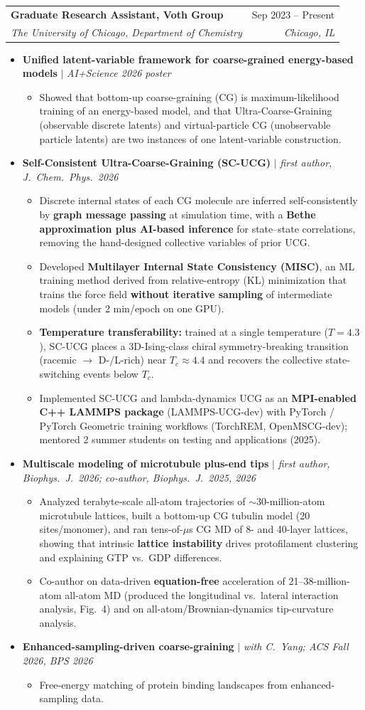 \documentclass[letterpaper,10.5pt]{article}
\makeatletter
\newcommand{\resumeItem}[1]{\item\small{#1\vspace{-1pt}}}
\newcommand{\resumeSubheading}[4]{
  \vspace{-1pt}\item
    \begin{tabular*}{\textwidth}[t]{l@{\extracolsep{\fill}}r}
      \textbf{#1} & \small #2 \\
      \textit{\small #3} & \textit{\small #4} \\
    \end{tabular*}\vspace{-6pt}
}
\newcommand{\resumeItemListStart}{\begin{itemize}[leftmargin=0.18in, itemsep=0.5pt, parsep=0pt]}
\newcommand{\resumeItemListEnd}{\end{itemize}\vspace{-4pt}}
\newcommand{\resumeTopic}[1]{\item\small{#1}\vspace{-1pt}}
\newcommand{\resumeSubItemListStart}{\begin{itemize}[leftmargin=0.2in, label={\scriptsize$\circ$}, itemsep=0pt, topsep=1pt]}
\newcommand{\resumeSubItemListEnd}{\end{itemize}\vspace{1pt}}
\makeatother
\begin{document}
    \resumeSubheading
      {Graduate Research Assistant, Voth Group}{Sep 2023 -- Present}
      {The University of Chicago, Department of Chemistry}{Chicago, IL}
      \resumeItemListStart
        \resumeTopic{\textbf{Unified latent-variable framework for coarse-grained energy-based models} $|$ \textit{AI+Science 2026 poster}}
        \resumeSubItemListStart
          \resumeItem{Showed that bottom-up coarse-graining (CG) is maximum-likelihood training of an energy-based model, and that Ultra-Coarse-Graining (observable discrete latents) and virtual-particle CG (unobservable particle latents) are two instances of one latent-variable construction.}
        \resumeSubItemListEnd
        \resumeTopic{\textbf{Self-Consistent Ultra-Coarse-Graining (SC-UCG)} $|$ \textit{first author, J.\ Chem.\ Phys.\ 2026}}
        \resumeSubItemListStart
          \resumeItem{Discrete internal states of each CG molecule are inferred self-consistently by \textbf{graph message passing} at simulation time, with a \textbf{Bethe approximation plus AI-based inference} for state--state correlations, removing the hand-designed collective variables of prior UCG.}
          \resumeItem{Developed \textbf{Multilayer Internal State Consistency (MISC)}, an ML training method derived from relative-entropy (KL) minimization that trains the force field \textbf{without iterative sampling} of intermediate models (under 2 min/epoch on one GPU).}
          \resumeItem{\textbf{Temperature transferability:} trained at a single temperature ($T=4.3$), SC-UCG places a 3D-Ising-class chiral symmetry-breaking transition (racemic $\rightarrow$ D-/L-rich) near $T_c\approx4.4$ and recovers the collective state-switching events below $T_c$.}
          \resumeItem{Implemented SC-UCG and lambda-dynamics UCG as an \textbf{MPI-enabled C++ LAMMPS package} (LAMMPS-UCG-dev) with PyTorch / PyTorch Geometric training workflows (TorchREM, OpenMSCG-dev); mentored 2 summer students on testing and applications (2025).}
        \resumeSubItemListEnd
        \resumeTopic{\textbf{Multiscale modeling of microtubule plus-end tips} $|$ \textit{first author, Biophys.\ J.\ 2026; co-author, Biophys.\ J.\ 2025, 2026}}
        \resumeSubItemListStart
          \resumeItem{Analyzed terabyte-scale all-atom trajectories of $\sim$30-million-atom microtubule lattices, built a bottom-up CG tubulin model (20 sites/monomer), and ran tens-of-$\mu$s CG MD of 8- and 40-layer lattices, showing that intrinsic \textbf{lattice instability} drives protofilament clustering and explaining GTP vs.\ GDP differences.}
          \resumeItem{Co-author on data-driven \textbf{equation-free} acceleration of 21--38-million-atom all-atom MD (produced the longitudinal vs.\ lateral interaction analysis, Fig.\ 4) and on all-atom/Brownian-dynamics tip-curvature analysis.}
        \resumeSubItemListEnd
        \resumeTopic{\textbf{Enhanced-sampling-driven coarse-graining} $|$ \textit{with C.\ Yang; ACS Fall 2026, BPS 2026}}
        \resumeSubItemListStart
          \resumeItem{Free-energy matching of protein binding landscapes from enhanced-sampling data.}
        \resumeSubItemListEnd
      \resumeItemListEnd
\end{document}
